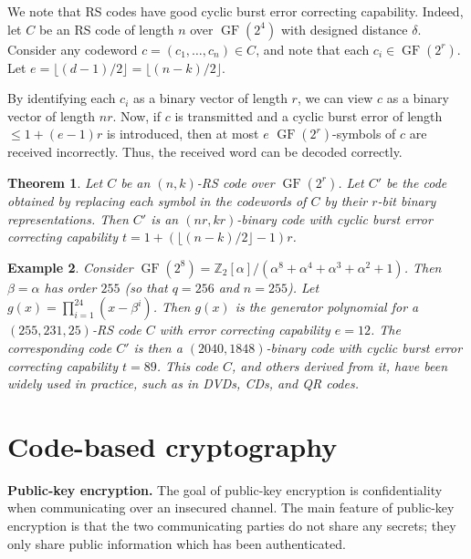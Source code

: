 \documentclass[10pt]{article}
\newcommand{\Z}{\mathbb{Z}}
\DeclareMathOperator{\GF}{GF}
\theoremstyle{newstyle}
\newtheorem{thm}{Theorem}[subsection]
\newtheorem{exmp}[thm]{Example}
\begin{document}
We note that RS codes have good cyclic burst error correcting capability. Indeed, let $C$ 
be an RS code of length $n$ over $\GF(2^4)$ with designed distance $\delta$. Consider any 
codeword $c = (c_1, \dots, c_n) \in C$, and note that each $c_i \in \GF(2^r)$. Let 
$e = \lfloor (d-1)/2 \rfloor = \lfloor (n-k)/2 \rfloor$. 

By identifying each $c_i$ as a binary vector of length $r$, we can view $c$ as a binary vector of 
length $nr$. Now, if $c$ is transmitted and a cyclic burst error of length $\leq 1 + (e-1)r$ is 
introduced, then at most $e$ $\GF(2^r)$-symbols of $c$ are received incorrectly. Thus, the 
received word can be decoded correctly.

\begin{thm}
Let $C$ be an $(n, k)$-RS code over $\GF(2^r)$. Let $C'$ be the code obtained by replacing 
each symbol in the codewords of $C$ by their $r$-bit binary representations. Then $C'$ 
is an $(nr, kr)$-binary code with cyclic burst error correcting capability 
$t = 1 + (\lfloor (n-k)/2 \rfloor - 1)r$. 
\end{thm}

\begin{exmp}
Consider $\GF(2^8) = \Z_2[\alpha]/(\alpha^8 + \alpha^4 + \alpha^3 + \alpha^2 + 1)$. Then 
$\beta = \alpha$ has order $255$ (so that $q = 256$ and $n = 255$). Let 
$g(x) = \prod_{i=1}^{24} (x-\beta^i)$.
Then $g(x)$ is the generator polynomial for a $(255, 231, 25)$-RS code $C$ with error 
correcting capability $e = 12$. The corresponding code $C'$ is then a $(2040, 1848)$-binary 
code with cyclic burst error correcting capability $t = 89$. 
This code $C$, and others derived from it, have been widely used in practice, such as in DVDs, 
CDs, and QR codes. 
\end{exmp}

\newpage 
\section{Code-based cryptography}

{\bf Public-key encryption.} The goal of public-key encryption is confidentiality when communicating 
over an insecured channel. The main feature of public-key encryption is that the two communicating 
parties do not share any secrets; they only share public information which has been 
authenticated. 
\end{document}
